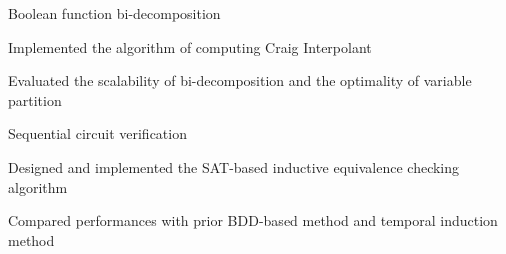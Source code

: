 \begin{myexp}
\begin{myexp}
\begin{mybullet}
        \end{mybullet}
    \item Boolean function bi-decomposition
        \begin{mybullet}
            \item Implemented the algorithm of computing Craig Interpolant
            \item Evaluated the scalability of bi-decomposition and the optimality of variable partition
        \end{mybullet}
    \item Sequential circuit verification
        \begin{mybullet}
            \item Designed and implemented the SAT-based inductive equivalence checking algorithm
            \item Compared performances with prior BDD-based method and temporal induction method
        \end{mybullet}
\end{myexp}

\end{myexp}
